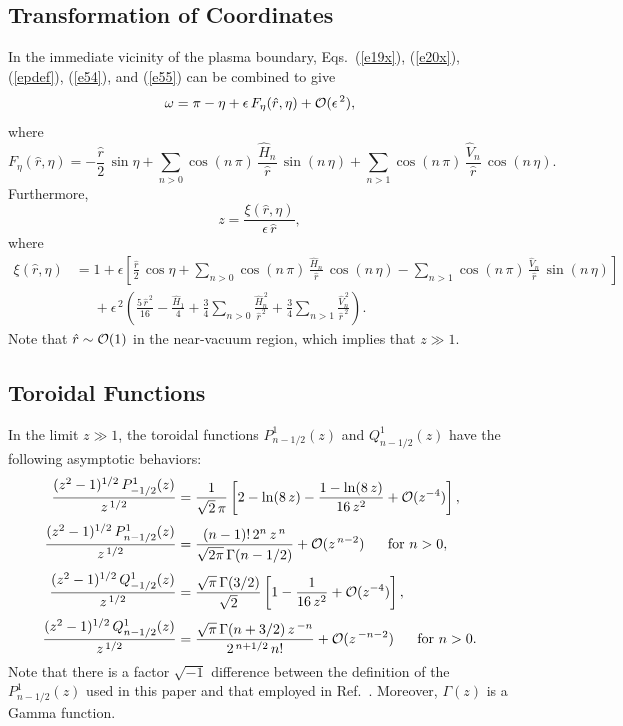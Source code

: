 \documentclass[12pt,prb,aps]{revtex4-1}
\begin{document}
\subsection{Transformation of Coordinates}\label{strans}
In the immediate vicinity of the plasma boundary, Eqs.~(\ref{e19x}), (\ref{e20x}), (\ref{epdef}), (\ref{e54}), and (\ref{e55}) can
be combined to give
\begin{equation}\label{e73h}
\omega=\pi-\eta +\epsilon\,F_\eta(\hat{r},\eta)+{\cal O}(\epsilon^{\,2}),
\end{equation}
where
\begin{equation}
F_\eta(\hat{r},\eta) = -\frac{\hat{r}}{2}\,\sin\eta+\sum_{n>0}\cos(n\,\pi)\,\frac{\hat{H}_n}{\hat{r}}\,\sin(n\,\eta)
+\sum_{n>1}\cos(n\,\pi)\,\frac{\hat{V}_n}{\hat{r}}\,\cos(n\,\eta).
\end{equation}
Furthermore, 
\begin{equation}\label{e74}
z = \frac{\xi(\hat{r},\eta)}{\epsilon\,\hat{r}},
\end{equation}
where 
\begin{align}\label{e75}
\xi(\hat{r},\eta)&= 1+ \epsilon\left[\frac{\hat{r}}{2}\,\cos\eta
 +\sum_{n>0}\cos(n\,\pi)\,\frac{\hat{H}_n}{\hat{r}}\,\cos(n\,\eta)-\sum_{n>1}\cos(n\,\pi)\,\frac{\hat{V}_n}{\hat{r}}\,\sin(n\,\eta)\right] \nonumber\\[0.5ex]
 &\phantom{=}+ \epsilon^{\,2}\left(\frac{5\,\hat{r}^{\,2}}{16}-\frac{\hat{H}_1}{4}
+\frac{3}{4}\sum_{n>0}\frac{\hat{H}_n^{\,2}}{\hat{r}^{\,2}}+\frac{3}{4}\sum_{n>1}\frac{\hat{V}_n^{\,2}}{\hat{r}^{\,2}}\right).
\end{align}
Note that  $\hat{r}\sim{\cal O}(1)$ in the near-vacuum region, which implies that $z\gg 1$. 

\subsection{Toroidal Functions}\label{stor}
In the limit $z\gg 1$, the toroidal functions $P_{n-1/2}^1(z)$ and $Q_{n-1/2}^1(z)$
have the following asymptotic behaviors:\,\cite{morse1,bate}
\begin{align}
\frac{(z^2-1)^{1/2}\,P_{-1/2}^1(z)}{z^{\,1/2}}&= \frac{1}{\sqrt{2}\,\pi}\left[2-\ln(8\,z)-\frac{1-\ln(8\,z)}{16\,z^2}+{\cal O}(z^{-4})\right],\label{e76}\\[0.5ex]
\frac{(z^2-1)^{1/2}\,P_{n-1/2}^1(z)}{z^{\,1/2}}&= \frac{(n-1)!\,2^n\,z^{\,n}}{\sqrt{2\pi}\,\Gamma(n-1/2)} + {\cal O}(z^{\,n-2})~~~~~\mbox{for $n>0$},\\[0.5ex]
\frac{(z^2-1)^{1/2}\,Q_{-1/2}^1(z)}{z^{\,1/2}}&= \frac{\sqrt{\pi}\,\Gamma(3/2)}{\sqrt{2}}\left[1-\frac{1}{16\,z^2}+{\cal O}(z^{-4})\right],\\[0.5ex]
\frac{(z^2-1)^{1/2}\,Q_{n-1/2}^1(z)}{z^{\,1/2}}&= \frac{\sqrt{\pi}\,\Gamma(n+3/2)\,z^{\,-n}}{2^{\,n+1/2}\,n!}+ {\cal O}(z^{\,-n-2})~~~~~\mbox{for $n>0$}.
\end{align}
Note that there is a factor $\sqrt{-1}$ difference between the definition of the $P_{n-1/2}^1(z)$ used in this paper and that employed in Ref.~.
Moreover, $\Gamma(z)$ is a Gamma function.\cite{abram1} 
\end{document}
